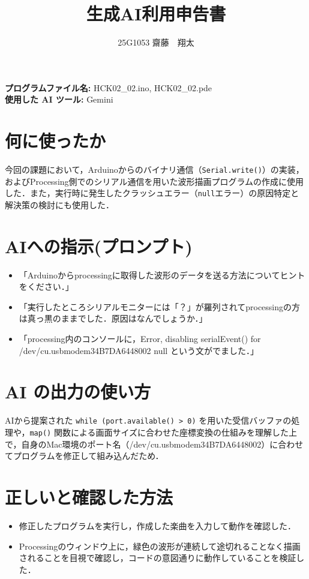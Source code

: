 \documentclass[uplatex,dvipdfmx]{jlreq}
\begin{document}
\title{生成AI利用申告書}
\author{25G1053 齋藤　翔太}
\maketitle

\noindent
\textbf{プログラムファイル名:} HCK02\_02.ino, HCK02\_02.pde \\
\textbf{使用した AI ツール:} Gemini

\section{何に使ったか}
今回の課題において，Arduinoからのバイナリ通信（\texttt{Serial.write()}）の実装，およびProcessing側でのシリアル通信を用いた波形描画プログラムの作成に使用した．また，実行時に発生したクラッシュエラー（\texttt{null}エラー）の原因特定と解決策の検討にも使用した．

\section{AIへの指示(プロンプト)}
\begin{itemize}
    \item 「Arduinoからprocessingに取得した波形のデータを送る方法についてヒントをください．」
    \item 「実行したところシリアルモニターには「？」が羅列されてprocessingの方は真っ黒のままでした．原因はなんでしょうか．」
    \item 「processing内のコンソールに，Error, disabling serialEvent() for /dev/cu.usbmodem34B7DA6448002 null という文がでました．」
\end{itemize}

\section{AI の出力の使い方}

AIから提案された \texttt{while (port.available() > 0)} を用いた受信バッファの処理や，\texttt{map()} 関数による画面サイズに合わせた座標変換の仕組みを理解した上で，自身のMac環境のポート名（/dev/cu.usbmodem34B7DA6448002）に合わせてプログラムを修正して組み込んだため．

\section{正しいと確認した方法}
\begin{itemize}
    \item 修正したプログラムを実行し，作成した楽曲を入力して動作を確認した．
    \item Processingのウィンドウ上に，緑色の波形が連続して途切れることなく描画されることを目視で確認し，コードの意図通りに動作していることを検証した．
\end{itemize}
\end{document}
